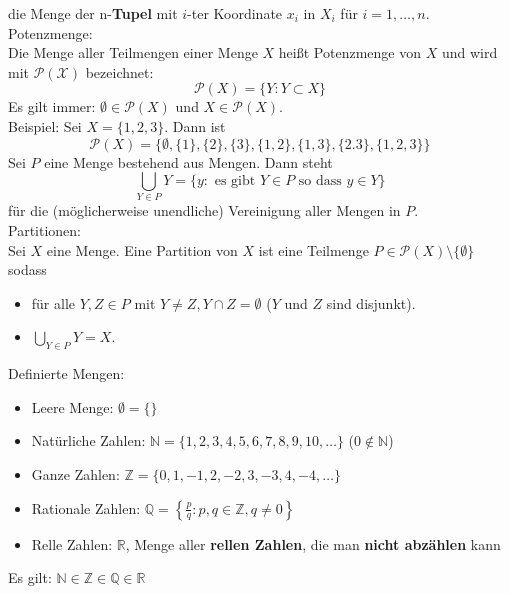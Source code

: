 \documentclass[12pt]{article}
\begin{document}
die Menge der n-\textbf{Tupel} mit $i$-ter Koordinate $x_i$ in $X_i$ für $i = 1,\dots,n$. \\
\newline
Potenzmenge: \\
Die Menge aller Teilmengen einer Menge $X$ heißt Potenzmenge von $X$ und wird mit $\mathcal{P(X)}$ bezeichnet:
\[\mathcal{P}(X) = \{Y: Y \subset X\}\]
Es gilt immer: $\emptyset \in \mathcal{P}(X)$ und $X \in \mathcal{P}(X)$.\\
Beispiel: Sei $X = \{1, 2, 3\}$. Dann ist \[\mathcal{P}(X) = \{\emptyset, \{1\}, \{2\}, \{3\}, \{1, 2\}, \{1, 3\}, \{2. 3\}, \{1, 2, 3\}\}\]
Sei $P$ eine Menge bestehend aus Mengen. Dann steht
\[\bigcup_{Y \in P} Y = \{y: \text{ es gibt } Y \in P \text{ so dass } y \in Y\}\]
für die (möglicherweise unendliche) Vereinigung aller Mengen in $P$. \\
\newline
Partitionen: \\
Sei $X$ eine Menge. Eine Partition von $X$ ist eine Teilmenge $P \in \mathcal{P}(X) \setminus \{\emptyset\}$ sodass
\begin{itemize}
    \item für alle $Y,Z \in P$ mit $Y \neq Z, Y \cap Z = \emptyset$ ($Y$ und $Z$ sind disjunkt).
    \item $\bigcup_{Y \in P} Y = X$. 
\end{itemize}
Definierte Mengen:
\begin{itemize}
    \item Leere Menge: $\emptyset = \{\}$
    \item Natürliche Zahlen: $\mathbb{N} = \{1, 2, 3, 4, 5, 6, 7, 8, 9, 10, \dots\}$ ($0 \notin \mathbb{N}$)
    \item Ganze Zahlen: $\mathbb{Z} = \{0, 1, -1, 2, -2, 3, -3, 4, -4, \dots\}$
    \item Rationale Zahlen: $\mathbb{Q} = \left\{\frac{p}{q} : p,q \in \mathbb{Z}, q \neq 0\right\}$
    \item Relle Zahlen: $\mathbb{R}$, Menge aller \textbf{rellen Zahlen}, die man \textbf{nicht abzählen} kann
\end{itemize}
Es gilt: $\mathbb{N} \in \mathbb{Z} \in \mathbb{Q} \in \mathbb{R}$
\end{document}
